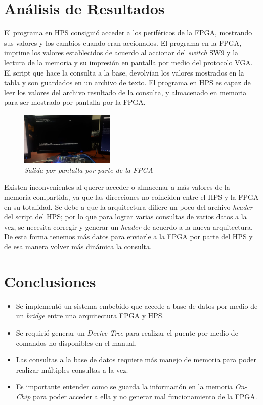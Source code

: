 \documentclass[conference]{IEEEtran}
\begin{document}
\section{Análisis de Resultados}\label{sec:resul}
El programa en HPS consiguió acceder a los periféricos de la FPGA, mostrando sus valores y los cambios cuando eran accionados. El programa en la FPGA, imprime los valores establecidos de acuerdo al accionar del \textit{switch} SW9 y la lectura de la memoria y su impresión en pantalla por medio del protocolo VGA. \\
El script que hace la consulta a la base, devolvían los valores mostrados en la tabla y son guardados en un archivo de texto. El programa en HPS es capaz de leer los valores del archivo resultado de la consulta, y almacenado en memoria para ser mostrado por pantalla por la FPGA.\\
\begin{figure}[h]
	\centerline{\includegraphics[width=0.4\textwidth]{img/res01.jpeg}}
	\caption{\textit{Salida por pantalla por parte de la FPGA}}
	\label{fig:qsys01}
\end{figure}
Existen inconvenientes al querer acceder o almacenar a más valores de la memoria compartida, ya que las direcciones no coinciden entre el HPS y la FPGA en su totalidad. Se debe a que la arquitectura difiere un poco del archivo \textit{header} del script del HPS; por lo que para lograr varias consultas de varios datos a la vez, se necesita corregir y generar un \textit{header} de acuerdo a la nueva arquitectura. De esta forma tenemos más datos para enviarle a la FPGA por parte del HPS y de esa manera volver más dinámica la consulta.

\section{Conclusiones}
\begin{itemize}
	\item Se implementó un sistema embebido que accede a base de datos por medio de un \textit{bridge} entre una arquitectura FPGA y HPS.
	\item Se requirió generar un \textit{Device Tree} para realizar el puente por medio de comandos no disponibles en el manual.
  \item Las consultas a la base de datos requiere más manejo de memoria para poder realizar múltiples consultas a la vez.
  \item Es importante entender como se guarda la información en la memoria \textit{On-Chip} para poder acceder a ella y no generar mal funcionamiento de la FPGA.
\end{itemize}
\end{document}
